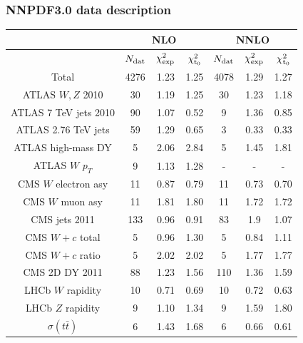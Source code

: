 \documentclass[10pt]{beamer}
\begin{document}


\begin{frame}
\frametitle{NNPDF3.0 data description}

\begin{center}
\begin{tabular}{c||ccc|ccc}
\hline
 & \multicolumn{3}{c}{NLO} & \multicolumn{3}{c}{NNLO} \\
\hline
 &  $N_{\rm dat}$  & $\chi^{2}_{\rm exp}$ & $\chi^{2}_{\rm t_0}$ & $N_{\rm dat}$  & $\chi^{2}_{\rm exp}$ & $\chi^{2}_{\rm t_0}$ \\
\hline
\hline
Total   & 4276 	& 1.23  & 1.25 & 4078 	& 1.29 & 1.27 \\
\hline
\hline
ATLAS $W,Z$ 2010   & 30 & 1.19 & 1.25 & 30 & 1.23 & 1.18\\
ATLAS 7 TeV jets 2010    & 90 & 1.07 & 0.52 & 9 & 1.36 & 0.85\\
ATLAS 2.76 TeV jets  & 59 & 1.29 & 0.65 & 3 & 0.33 & 0.33\\
ATLAS high-mass DY  & 5 & 2.06 & 2.84 & 5 & 1.45 & 1.81\\
ATLAS $W$ $p_T$  &   9 & 1.13 & 1.28 & - & - & - \\
CMS $W$ electron asy   & 11 & 0.87 & 0.79 & 11 & 0.73 & 0.70\\
CMS $W$ muon asy   & 11 & 1.81 & 1.80 & 11 & 1.72 & 1.72\\
CMS jets 2011   & 133 & 0.96 & 0.91 & 83 & 1.9 & 1.07\\
CMS $W+c$ total   & 5 & 0.96 & 1.30 & 5 & 0.84 & 1.11\\
CMS $W+c$ ratio   & 5 & 2.02 & 2.02 & 5 & 1.77 & 1.77\\
CMS 2D DY 2011   & 88 & 1.23 & 1.56 & 110 & 1.36 & 1.59\\
LHCb $W$ rapidity   & 10 & 0.71 & 0.69 & 10 & 0.72 & 0.63\\
LHCb $Z$ rapidity   & 9 & 1.10 & 1.34 & 9 & 1.59 & 1.80\\
$\sigma(t\bar{t})$  & 6 & 1.43 & 1.68 & 6 & 0.66 & 0.61\\
\hline
\hline
\end{tabular}
\end{center}



 \end{frame} 
\end{document}
